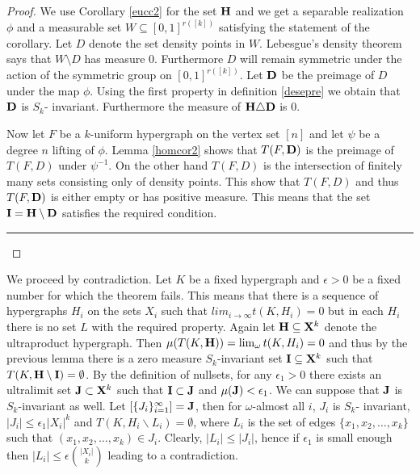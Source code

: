 \documentclass [11pt] {article}
\newcommand{\qed} {\hspace {0.1in} \rule {1.5mm} {3.5mm}}
\newtheorem{theorem}{Theorem}
\def\e{\epsilon}
\def\limo{\lim_{\omega}}
\def\bH{{\bf H}}
\def\bI{{\bf I}}
\def\bJ{{\bf J}}
\def\to{\rightarrow}
\def\xo{{\bf X}}
\begin{document}
\begin{proof} We use Corollary \ref{eucc2} for the set $\bH$ and
we get a separable realization $\phi$ and a measurable set $W\subseteq
[0,1]^{r([k])}$ satisfying the statement of the corollary.
Let $D$ denote the set density points in $W$. Lebesgue's density theorem
says that $W\setminus D$ has measure $0$. Furthermore $D$ will remain
symmetric under
the action of the symmetric group on $[0,1]^{r([k])}$.
Let ${\bf D}$ be the preimage of $D$ under the map $\phi$. Using the
first property in
definition \ref{desepre} we obtain that ${\bf D}$ is $S_k$-
invariant. Furthermore the
measure of ${\bf H}\triangle {\bf D}$ is $0$.

Now let $F$ be a $k$-uniform hypergraph on the vertex set $[n]$ and let
$\psi$ be a
degree $n$ lifting of $\phi$. Lemma \ref{homcor2} shows that $T(F,{\bf D})$ is
the preimage of $T(F,D)$ under $\psi^{-1}$. On the other hand $T(F,D)$ is
the intersection of finitely
many sets consisting only of density points. This show that $T(F,D)$ and
thus $T(F,{\bf D})$ is either empty or has
positive measure. This means that the set ${\bf I}={\bf H}\setminus {\bf D}$
satisfies the
required condition.
\qed\end{proof}




 We proceed by
contradiction.
Let $K$ be a fixed hypergraph
and
  $\epsilon>0$ be a fixed number for which the theorem fails. This means that
  there is a sequence of hypergraphs $H_i$ on the sets $X_i$ such that
  $lim_{i\to\infty}t(K,H_i)=0$ but in each $H_i$ there is no set $L$ with the
  required property. Again let
  $\bH\subseteq\xo^k$ denote the ultraproduct hypergraph. Then
   $\mu(T(K,\bH))=\limo t(K,H_i)=0$ and thus by the previous lemma
  there is a
  zero measure $S_k$-invariant
  set $\bI\subseteq\xo^k$ such that $T(K,\bH\setminus
  \bI)=\emptyset$. By the definition of nullsets, for any $\e_1>0$ there exists
 an ultralimit set $\bJ\subset \xo^k$ such that $\bI\subset \bJ$ and
$\mu(\bJ)<
 \e_1$. We can suppose that $\bJ$ is $S_k$-invariant as well. Let
 $[\{J_i\}_{i=1}^\infty]=\bJ$, then
for $\omega$-almost all $i$, $J_i$ is $S_k$-
 invariant, $|J_i|\leq \e_1|X_i|^k$ and $T(K,H_i\backslash L_i)=\emptyset$,
 where $L_i$ is the set of edges $\{x_1,x_2,\dots, x_k\}$ such that
 $(x_1,x_2,\dots,x_k)\in J_i$. Clearly, $|L_i|\leq |J_i|$, hence if
$\e_1$ is small enough then $|L_i|\leq \epsilon{{|X_i|}\choose{k}}$
leading to a contradiction.
\end{document}
